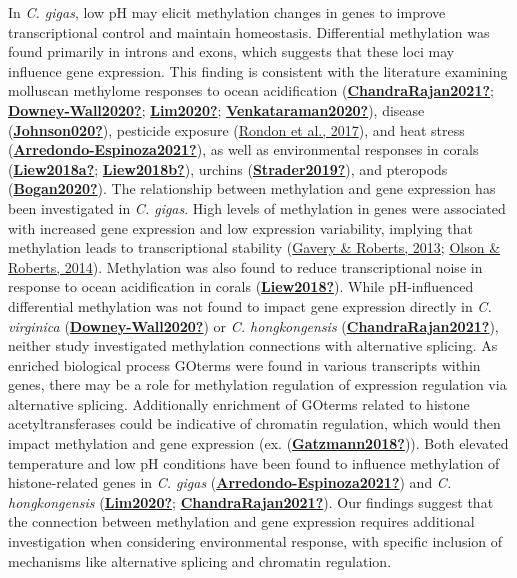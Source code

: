 \documentclass [11pt, proquest] {uwthesis}[2015/03/03]
\begin{document}
In \emph{C. gigas}, low pH may elicit methylation changes in genes to improve transcriptional control and maintain homeostasis. Differential methylation was found primarily in introns and exons, which suggests that these loci may influence gene expression. This finding is consistent with the literature examining molluscan methylome responses to ocean acidification (\protect\hyperlink{ref-ChandraRajan2021}{\textbf{ChandraRajan2021?}}; \protect\hyperlink{ref-Downey-Wall2020}{\textbf{Downey-Wall2020?}}; \protect\hyperlink{ref-Lim2020}{\textbf{Lim2020?}}; \protect\hyperlink{ref-Venkataraman2020}{\textbf{Venkataraman2020?}}), disease (\protect\hyperlink{ref-Johnson020}{\textbf{Johnson020?}}), pesticide exposure (\protect\hyperlink{ref-Rondon2017}{Rondon et al., 2017}), and heat stress (\protect\hyperlink{ref-Arredondo-Espinoza2021}{\textbf{Arredondo-Espinoza2021?}}), as well as environmental responses in corals (\protect\hyperlink{ref-Liew2018a}{\textbf{Liew2018a?}}; \protect\hyperlink{ref-Liew2018b}{\textbf{Liew2018b?}}), urchins (\protect\hyperlink{ref-Strader2019}{\textbf{Strader2019?}}), and pteropods (\protect\hyperlink{ref-Bogan2020}{\textbf{Bogan2020?}}). The relationship between methylation and gene expression has been investigated in \emph{C. gigas}. High levels of methylation in genes were associated with increased gene expression and low expression variability, implying that methylation leads to transcriptional stability (\protect\hyperlink{ref-Gavery2013}{Gavery \& Roberts, 2013}; \protect\hyperlink{ref-Olson2014}{Olson \& Roberts, 2014}). Methylation was also found to reduce transcriptional noise in response to ocean acidification in corals (\protect\hyperlink{ref-Liew2018}{\textbf{Liew2018?}}). While pH-influenced differential methylation was not found to impact gene expression directly in \emph{C. virginica} (\protect\hyperlink{ref-Downey-Wall2020}{\textbf{Downey-Wall2020?}}) or \emph{C. hongkongensis} (\protect\hyperlink{ref-ChandraRajan2021}{\textbf{ChandraRajan2021?}}), neither study investigated methylation connections with alternative splicing. As enriched biological process GOterms were found in various transcripts within genes, there may be a role for methylation regulation of expression regulation via alternative splicing. Additionally enrichment of GOterms related to histone acetyltransferases could be indicative of chromatin regulation, which would then impact methylation and gene expression (ex. (\protect\hyperlink{ref-Gatzmann2018}{\textbf{Gatzmann2018?}})). Both elevated temperature and low pH conditions have been found to influence methylation of histone-related genes in \emph{C. gigas} (\protect\hyperlink{ref-Arredondo-Espinoza2021}{\textbf{Arredondo-Espinoza2021?}}) and \emph{C. hongkongensis} (\protect\hyperlink{ref-Lim2020}{\textbf{Lim2020?}}; \protect\hyperlink{ref-ChandraRajan2021}{\textbf{ChandraRajan2021?}}). Our findings suggest that the connection between methylation and gene expression requires additional investigation when considering environmental response, with specific inclusion of mechanisms like alternative splicing and chromatin regulation.
\end{document}
